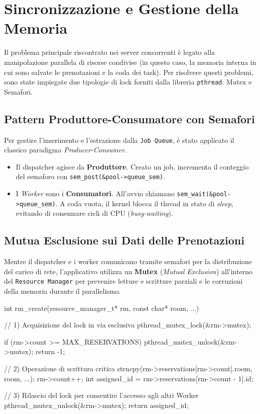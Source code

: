 \documentclass[a4paper,12pt]{article}
\begin{document}
\newpage
\section{Sincronizzazione e Gestione della Memoria}
Il problema principale riscontrato nei server concorrenti è legato alla manipolazione parallela di risorse condivise (in questo caso, la memoria interna in cui sono salvate le prenotazioni e la coda dei task). Per risolvere questi problemi, sono state impiegate due tipologie di lock forniti dalla libreria \texttt{pthread}: Mutex e Semafori.

\subsection{Pattern Produttore-Consumatore con Semafori}
Per gestire l'inserimento e l'estrazione dalla \texttt{Job Queue}, è stato applicato il classico paradigma \textit{Producer-Consumer}.
\begin{itemize}
    \item Il dispatcher agisce da \textbf{Produttore}. Creato un job, incrementa il conteggio del semaforo con \texttt{sem\_post(\&pool->queue\_sem)}.
    \item I \textit{Worker} sono i \textbf{Consumatori}. All'avvio chiamano \texttt{sem\_wait(\&pool->queue\_sem)}. A coda vuota, il kernel blocca il thread in stato di \textit{sleep}, evitando di consumare cicli di CPU (\textit{busy-waiting}).
\end{itemize}

\subsection{Mutua Esclusione sui Dati delle Prenotazioni}
Mentre il dispatcher e i worker comunicano tramite semafori per la distribuzione del carico di rete, l'applicativo utilizza un \textbf{Mutex} (\textit{Mutual Exclusion}) all'interno del \texttt{Resource Manager} per prevenire letture e scritture parziali e le corruzioni della memoria durante il parallelismo.

\begin{ccode}
int rm_create(resource_manager_t* rm, const char* room, ...) {
    // 1) Acquisizione del lock in via esclusiva
    pthread_mutex_lock(&rm->mutex);
    
    if (rm->count >= MAX_RESERVATIONS) {
        pthread_mutex_unlock(&rm->mutex);
        return -1;
    }
    
    // 2) Operazione di scrittura critica
    strncpy(rm->reservations[rm->count].room, room, ...);
    rm->count++;
    int assigned_id = rm->reservations[rm->count - 1].id;
    
    // 3) Rilascio del lock per consentire l'accesso agli altri Worker
    pthread_mutex_unlock(&rm->mutex);
    return assigned_id;
}
\end{ccode}
\end{document}
